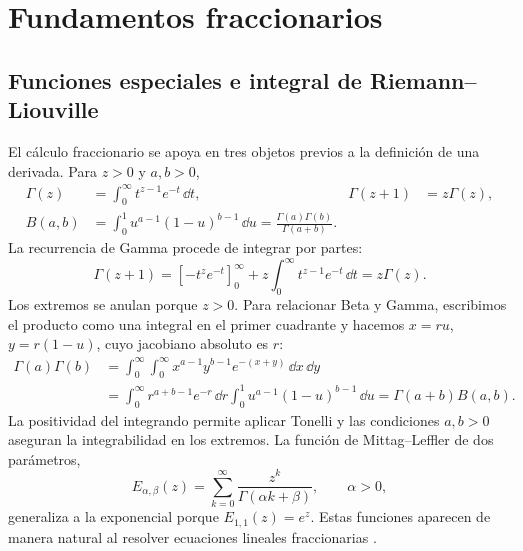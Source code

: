 \ifdefined\HAFOFractionalBlockOperators
\section{Fundamentos fraccionarios}
\label{sec:fundamentos}

\HAFOCardFractional

\subsection{Funciones especiales e integral de Riemann--Liouville}

El cálculo fraccionario se apoya en tres objetos previos a la definición de una
derivada. Para \(z>0\) y \(a,b>0\),
\begin{align}
 \Gamma(z)&=\int_0^\infty t^{z-1}e^{-t}\,\dd t,
 &\Gamma(z+1)&=z\Gamma(z),\label{eq:gamma-fractional}\\
 B(a,b)&=\int_0^1 u^{a-1}(1-u)^{b-1}\,\dd u
 =\frac{\Gamma(a)\Gamma(b)}{\Gamma(a+b)}.\label{eq:beta-gamma}
\end{align}
La recurrencia de Gamma procede de integrar por partes:
\[
 \Gamma(z+1)=[-t^ze^{-t}]_0^\infty+
 z\int_0^\infty t^{z-1}e^{-t}\,\dd t=z\Gamma(z).
\]
Los extremos se anulan porque \(z>0\). Para relacionar Beta y Gamma,
escribimos el producto como una integral en el primer cuadrante y hacemos
\(x=ru\), \(y=r(1-u)\), cuyo jacobiano absoluto es \(r\):
\begin{align*}
 \Gamma(a)\Gamma(b)
 &=\int_0^\infty\!\int_0^\infty
 x^{a-1}y^{b-1}e^{-(x+y)}\,\dd x\,\dd y\\
 &=\int_0^\infty r^{a+b-1}e^{-r}\,\dd r
   \int_0^1u^{a-1}(1-u)^{b-1}\,\dd u
 =\Gamma(a+b)B(a,b).
\end{align*}
La positividad del integrando permite aplicar Tonelli y las condiciones
\(a,b>0\) aseguran la integrabilidad en los extremos.
La función de Mittag--Leffler de dos parámetros,
\begin{equation}
 E_{\alpha,\beta}(z)=\sum_{k=0}^{\infty}
 \frac{z^k}{\Gamma(\alpha k+\beta)},
 \qquad \alpha>0,
 \label{eq:mittag-leffler-definition}
\end{equation}
generaliza a la exponencial porque \(E_{1,1}(z)=e^z\). Estas funciones
aparecen de manera natural al resolver ecuaciones lineales fraccionarias
\cite{Podlubny1999,Monje2010,Oliveira2019SolvedFractional}.

